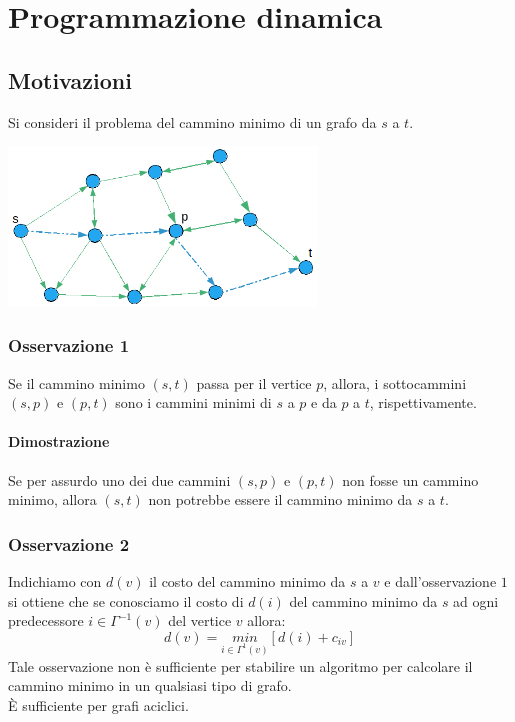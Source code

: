 \chapter{Programmazione dinamica}
\section{Motivazioni}
Si consideri il problema del cammino minimo di un grafo da $s$ a $t$.\\
\centerline{\includegraphics[height=4.25cm]{images/graph37.png}}
\subsection{Osservazione 1}
Se il cammino minimo $(s,t)$ passa per il vertice $p$, allora, i sottocammini $(s,p)$ e $(p,t)$ sono i cammini minimi di $s$ a $p$ e da $p$ a $t$, rispettivamente.
\subsubsection{Dimostrazione}
Se per assurdo uno dei due cammini $(s,p)$ e $(p,t)$ non fosse un cammino minimo, allora $(s,t)$ non potrebbe essere il cammino minimo da $s$ a $t$.
\subsection{Osservazione 2}
Indichiamo con $d(v)$ il costo del cammino minimo da $s$ a $v$ e dall'osservazione $1$ si ottiene che se conosciamo il costo di $d(i)$ del cammino minimo da $s$ ad ogni predecessore $i\in \Gamma^{-1}(v)$ del vertice $v$ allora:
\begin{equation}
	d(v)=\underset{i\in\Gamma^{1}(v)}{min}[d(i)+c_{iv}] \label{eq:4.1}
\end{equation}
Tale osservazione non è sufficiente per stabilire un algoritmo per calcolare il cammino minimo in un qualsiasi tipo di grafo.\\
È sufficiente per grafi aciclici.

